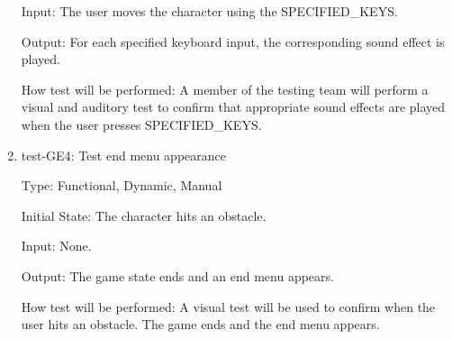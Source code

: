 \documentclass[12pt, titlepage]{article}
\begin{document}
\begin{enumerate}
Input: The user moves the character using the SPECIFIED\_KEYS.
					
Output: For each specified keyboard input, the corresponding sound effect is played.
					
How test will be performed: A member of the testing team will perform a visual and auditory test to confirm that appropriate sound effects are played when the user presses SPECIFIED\_KEYS.

\item{test-GE4: Test end menu appearance\\}

Type: Functional, Dynamic, Manual
					
Initial State: The character hits an obstacle.
					
Input: None.
					
Output: The game state ends and an end menu appears.
					
How test will be performed: A visual test will be used to confirm when the user hits an obstacle. The game ends and the end menu appears.

\end{enumerate}
\end{document}
